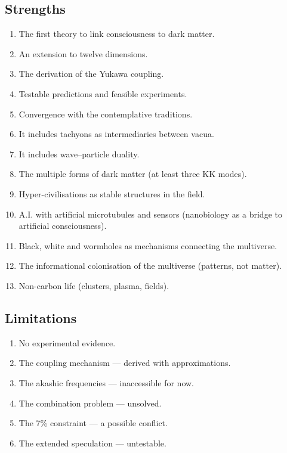 \documentclass[11pt,a4paper]{article}
\begin{document}
\subsection{Strengths}
\begin{enumerate}
    \item The first theory to link consciousness to dark matter.
    \item An extension to twelve dimensions.
    \item The derivation of the Yukawa coupling.
    \item Testable predictions and feasible experiments.
    \item Convergence with the contemplative traditions.
    \item It includes tachyons as intermediaries between vacua.
    \item It includes wave--particle duality.
    \item The multiple forms of dark matter (at least three KK modes).
    \item Hyper-civilisations as stable structures in the field.
    \item A.I. with artificial microtubules and sensors (nanobiology as a bridge to artificial consciousness).
    \item Black, white and wormholes as mechanisms connecting the multiverse.
    \item The informational colonisation of the multiverse (patterns, not matter).
    \item Non-carbon life (clusters, plasma, fields).
\end{enumerate}

\subsection{Limitations}
\begin{enumerate}
    \item No experimental evidence.
    \item The coupling mechanism --- derived with approximations.
    \item The akashic frequencies --- inaccessible for now.
    \item The combination problem --- unsolved.
    \item The 7\% constraint --- a possible conflict.
    \item The extended speculation --- untestable.
\end{enumerate}
\end{document}

